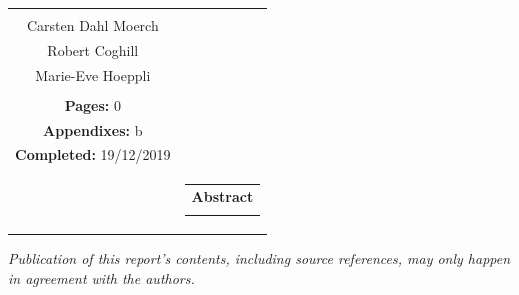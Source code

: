 \begin{titlepage}
\begin{nopagebreak}
{\begin{tabular}{cc}
{{\textbf{Supervisors:}\\
Carsten Dahl Moerch \\
Robert Coghill \\
Marie-Eve Hoeppli \\
}\\


\textbf{Pages:} 0\\
\textbf{Appendixes:} b \\
\textbf{Completed:} 19/12/2019\\

\vfill } &
\parbox{7cm}{
  \vspace{.15cm}
  \hfill
  \begin{tabular}{l}
  {\textbf{Abstract}}\bigskip \\
  \fbox{
    \parbox{6.5cm}{\bigskip
     {\vfill{\small 
     \bigskip}}
     }}
   \end{tabular}}

\end{tabular}} %


\centering
\textit{Publication of this report's contents, including source references, may only happen in agreement with the authors.}\\


\end{nopagebreak}
\end{titlepage}
%